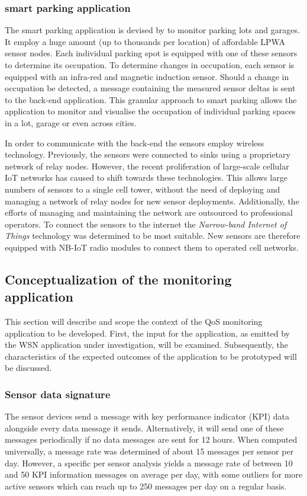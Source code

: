 \subsubsection*{\sensit smart parking application}
The \sensit\cite{web:sensit} smart parking application is devised by \nedapidsystems to monitor parking lots and garages. It employ a huge amount (up to thousands per location) of affordable LPWA sensor nodes. Each individual parking spot is equipped with one of these sensors to determine its occupation. To determine changes in occupation, each sensor is equipped with an infra-red and magnetic induction sensor. Should a change in occupation be detected, a message containing the measured sensor deltas is sent to the back-end application. This granular approach to smart parking allows the \sensit application to monitor and visualise the occupation of individual parking spaces in a lot, garage or even across cities.

In order to communicate with the back-end the sensors employ wireless technology. Previously, the sensors were connected to sinks using a proprietary network of relay nodes. However, the recent proliferation of large-scale cellular IoT networks has caused \nedap to shift towards these technologies. This allows large numbers of sensors to a single cell tower, without the need of deploying and managing a network of relay nodes for new sensor deployments. Additionally, the efforts of managing and maintaining the network are outsourced to professional operators. To connect the sensors to the internet the \emph{Narrow-band Internet of Things} technology was determined to be most suitable. New \sensit sensors are therefore equipped with \ublox\cite{web:ublox} NB-IoT radio modules to connect them to operated cell networks.

\subsection{Conceptualization of the monitoring application}
This section will describe and scope the context of the QoS monitoring application to be developed. First, the input for the application, as emitted by the WSN application under investigation, will be examined. Subsequently, the characteristics of the expected outcomes of the application to be prototyped will be discussed.

\subsubsection{Sensor data signature}
The sensor devices send a message with key performance indicator (KPI) data alongside every data message it sends. Alternatively, it will send one of these messages periodically if no data messages are sent for 12 hours. When computed universally, a message rate was determined of about 15 messages per sensor per day. However, a specific per sensor analysis yields a message rate of between 10 and 50 KPI information messages on average per day, with some outliers for more active sensors which can reach up to 250 messages per day on a regular basis.

